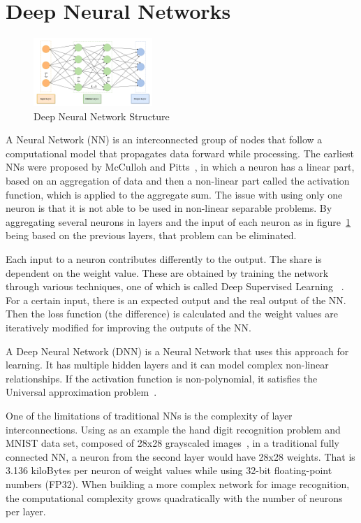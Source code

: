 \documentclass[conference]{IEEEtran}
\begin{document}

\section{Deep Neural Networks}
\label{chapter:cnn}

\begin{figure}[!htb]
    \centering
    \includegraphics[width=0.4\textwidth]{Figures/mlp.png}
    \caption{Deep Neural Network Structure}
    \label{MLP}
\end{figure}

A Neural Network (NN) is an interconnected group of nodes that follow a
computational model that propagates data forward while processing. The earliest
NNs were proposed by McCulloh and Pitts~\cite{neuron:model}, in which a neuron
has a linear part, based on an aggregation of data and then a non-linear part
called the activation function, which is applied to the aggregate sum. The issue
with using only one neuron is that it is not able to be used in non-linear
separable problems. By aggregating several neurons in layers and the input of
each neuron as in figure~\ref{MLP} being based on the previous layers, that
problem can be eliminated.

Each input to a neuron contributes differently to the output. The share is
dependent on the weight value. These are obtained by training the network
through various techniques, one of which is called Deep Supervised
Learning~\cite{deeplearning} . For a certain input, there is an expected output
and the real output of the NN. Then the loss function (the difference) is
calculated and the weight values are iteratively modified for improving the
outputs of the NN.

A Deep Neural Network (DNN) is a Neural Network that uses this approach for
learning. It has multiple hidden layers and it can model complex non-linear
relationships. If the activation function is non-polynomial, it satisfies the
Universal approximation problem~\cite{approximation:problem}.

One of the limitations of traditional NNs is the complexity of layer
interconnections. Using as an example the hand digit recognition problem and MNIST
data set, composed of 28x28 grayscaled images~\cite{mnist:digits}, in a
traditional fully connected NN, a neuron from the second layer would have 28x28
weights. That is 3.136 kiloBytes per neuron of weight values while using 32-bit
floating-point numbers (FP32). When building a more complex network for image
recognition, the computational complexity grows quadratically with the number
of neurons per layer.
\end{document}
